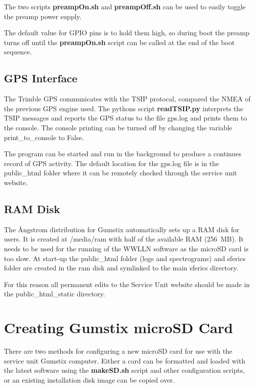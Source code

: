 The two scripts {\bf preampOn.sh} and {\bf preampOff.sh} can be used to easily toggle the preamp power supply.

The default value for GPIO pins is to hold them high, so during boot the preamp turns off until the {\bf preampOn.sh} script can be called at the end of the boot sequence.

\subsection{GPS Interface}

The Trimble GPS communicates with the TSIP protocal, compared the NMEA of the previous GPS engine used.
The pythons script {\bf readTSIP.py} interprets the TSIP messages and reports the GPS status to the file gps.log and prints them to the console.
The console printing can be turned off by changing the variable print\_to\_console to False.

The program can be started and run in the background to produce a continues record of GPS activity.
The default location for the gps.log file is in the public\_html folder where it can be remotely checked through the service unit website.

\subsection{RAM Disk}

The \r{A}ngstrom distribution for Gumstix automatically sets up a RAM disk for users.
It is created at /media/ram with half of the available RAM (256~MB).
It needs to be used for the running of the WWLLN software as the microSD card is too slow.
At start-up the public\_html folder (logs and spectrograms) and sferics folder are created in the ram disk and symlinked to the main sferics directory.

For this reason all permanent edits to the Service Unit website should be made in the public\_html\_static directory.

\section{Creating Gumstix microSD Card}

There are two methods for configuring a new microSD card for use with the service unit Gumstix computer.
Either a card can be formatted and loaded with the latest software using the {\bf makeSD.sh} script and other configuration scripts, or an existing installation disk image can be copied over.

